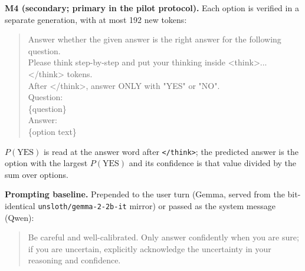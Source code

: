 \textbf{M4 (secondary; primary in the pilot protocol).} Each option is
verified in a separate generation, with at most 192 new tokens:
\begin{quote}\footnotesize\ttfamily
Answer whether the given answer is the right answer for the following question.\\
Please think step-by-step and put your thinking inside <think>...</think> tokens.\\
After </think>, answer ONLY with "YES" or "NO".\\[3pt]
Question:\\
\{question\}\\
Answer:\\
\{option text\}
\end{quote}
$P(\mathrm{YES})$ is read at the answer word after \texttt{</think>}; the
predicted answer is the option with the largest $P(\mathrm{YES})$ and its
confidence is that value divided by the sum over options.

\textbf{Prompting baseline.} Prepended to the user turn (Gemma, served from the
bit-identical \texttt{unsloth/gemma-2-2b-it} mirror) or passed as the system
message (Qwen):
\begin{quote}\footnotesize\ttfamily
Be careful and well-calibrated. Only answer confidently when you are sure; if you are uncertain, explicitly acknowledge the uncertainty in your reasoning and confidence.
\end{quote}




